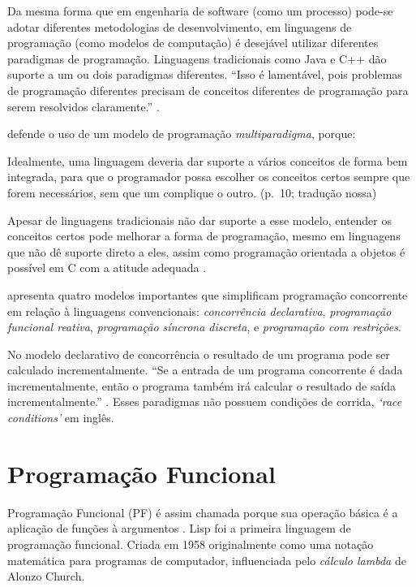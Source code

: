 Da mesma forma que em engenharia de software (como um processo) pode-se adotar
diferentes metodologias de desenvolvimento, em linguagens de programação (como
modelos de computação) é desejável utilizar diferentes paradigmas de
programação.
Linguagens tradicionais como Java e C++ dão suporte a um ou dois paradigmas
diferentes.
“Isso é lamentável, pois problemas de programação diferentes precisam de
conceitos diferentes de programação para serem resolvidos claramente.”
\cite[p. 10]{roy2009}.

\textcite{roy2009} defende o uso de um modelo de programação \emph{multiparadigma},
porque:

\begin{citacao}
  Idealmente, uma linguagem deveria dar suporte a vários conceitos de forma
  bem integrada, para que o programador possa escolher os conceitos certos
  sempre que forem necessários, sem que um complique o outro.
  (p.~10; tradução nossa)
\end{citacao}

Apesar de linguagens tradicionais não dar suporte a esse modelo, entender os
conceitos certos pode melhorar a forma de programação, mesmo em linguagens que
não dê suporte direto a eles, assim como programação orientada a objetos é
possível em C com a atitude adequada \cite{roy2009}.

\textcite{roy2009} apresenta quatro modelos importantes que simplificam
programação concorrente em relação à linguagens convencionais: \emph{concorrência
declarativa}, \emph{programação funcional reativa}, \emph{programação síncrona
discreta}, e \emph{programação com restrições}.

No modelo declarativo de concorrência o resultado de um programa pode ser
calculado incrementalmente.
“Se a entrada de um programa concorrente é dada incrementalmente, então o
programa também irá calcular o resultado de saída incrementalmente.”
\cite[p. 238; tradução nossa]{roy2004}.
Esses paradigmas não possuem condições de corrida, \emph{‘race conditions’} em
inglês.

\section{Programação Funcional}
\label{sec:org75febf5}
Programação Funcional (PF) é assim chamada porque sua operação básica é a
aplicação de funções à argumentos \cite{hughes1990}.
Lisp foi a primeira linguagem de programação funcional.
Criada em 1958 originalmente como uma notação matemática para programas de
computador, influenciada pelo \emph{cálculo lambda} de Alonzo Church.

